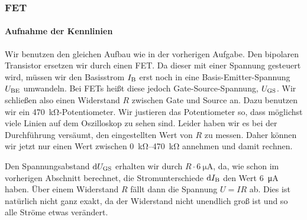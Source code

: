 \subsubsection{FET}

\paragraph{Aufnahme der Kennlinien}

Wir benutzen den gleichen Aufbau wie in der vorherigen Aufgabe. Den bipolaren
Transistor ersetzen wir durch einen FET. Da dieser mit einer Spannung gesteuert
wird, müssen wir den Basisstrom $I_\text{B}$ erst noch in eine Basis-Emitter-Spannung
$U_\text{BE}$ umwandeln. Bei FETs heißt diese jedoch Gate-Source-Spannung, $U_\text{GS}$. Wir
schließen also einen Widerstand $R$ zwischen Gate und Source an. Dazu benutzen
wir ein \SI{470}{\kilo\ohm}-Potentiometer. Wir justieren das Potentiometer so,
dass möglichst viele Linien auf dem Oszilloskop zu sehen sind. Leider haben wir
es bei der Durchführung versäumt, den eingestellten Wert von $R$ zu messen.
Daher können wir jetzt nur einen Wert zwischen \SIrange{0}{470}{\kilo\ohm}
annehmen und damit rechnen.

Den Spannungsabstand $\dif\UGS$ erhalten wir durch $R \cdot
\SI{6}{\micro\ampere}$, da, wie schon im vorherigen Abschnitt berechnet, die
Stromunterschiede $\dif\IB$ den Wert \SI{6}{\micro\ampere} haben. Über einem
Widerstand $R$ fällt dann die Spannung $U = IR$ ab. Dies ist natürlich nicht
ganz exakt, da der Widerstand nicht unendlich groß ist und so alle Ströme etwas
verändert.

